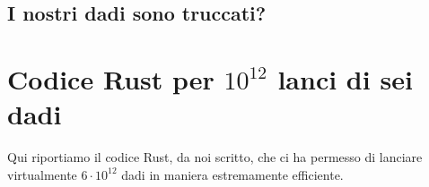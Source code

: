 \documentclass{article}
\begin{document}
\begin{appendices}
\subsection{I nostri dadi sono truccati?}

\pagebreak
\section{Codice Rust per $10^{12}$ lanci di sei dadi}

Qui riportiamo il codice Rust, da noi scritto, che ci ha permesso di
lanciare virtualmente $6\cdot10^{12}$ dadi in maniera estremamente
efficiente.

\inputminted[linenos, mathescape]{rust}{src/main.rs}

\end{appendices}
\end{document}
